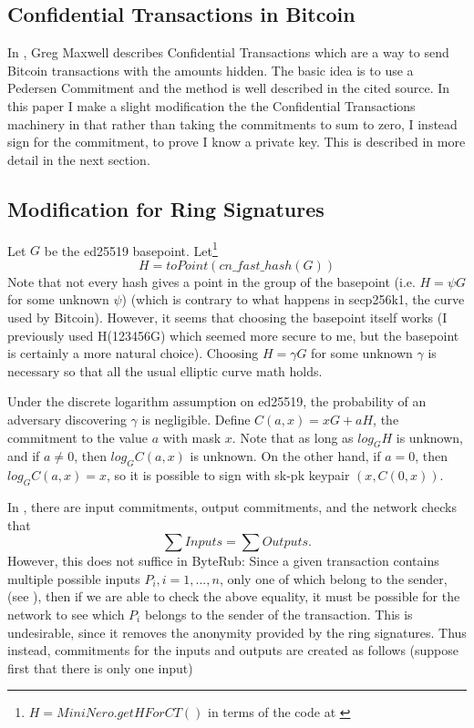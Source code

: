 \documentclass[12pt,english]{mrl}
\theoremstyle{definition}
\numberwithin{equation}{section}
\numberwithin{figure}{section}
\numberwithin{equation}{section}
\numberwithin{equation}{section}
\numberwithin{figure}{section}
\begin{document}
\subsection{Confidential Transactions in Bitcoin}

In \cite{GM}, Greg Maxwell describes Confidential Transactions which
are a way to send Bitcoin transactions with the amounts hidden. The
basic idea is to use a Pedersen Commitment and the method is well
described in the cited source. In this paper I make a slight modification
the the Confidential Transactions machinery in that rather than taking
the commitments to sum to zero, I instead sign for the commitment,
to prove I know a private key. This is described in more detail in
the next section. 


\subsection{Modification for Ring Signatures}

Let $G$ be the ed25519 basepoint. Let\footnote{$H=MiniNero.getHForCT()$ in terms of the code at \cite{Snoe}}
\[
H=toPoint\left(cn\_fast\_hash\left(G\right)\right)
\]
Note that not every hash gives a point in the group of the basepoint (i.e. $H=\psi G$ for some unknown $\psi$) (which is contrary to what happens in secp256k1, the curve used by Bitcoin). However, it seems that choosing the basepoint itself works (I previously used H(123456G) which seemed more secure to me, but the basepoint is certainly a more natural choice). 
Choosing $H = \gamma G$ for some unknown $\gamma$ is necessary so that all the usual elliptic curve math holds.

Under the discrete
logarithm assumption on ed25519, the probability of an adversary discovering $\gamma$
is negligible.  
Define $C\left(a,x\right)=xG+aH$, the commitment to the value $a$
with mask $x$. Note that as long as $log_{G}H$ is unknown, and if
$a\neq0$, then $log_{G}C\left(a,x\right)$ is unknown. On the other
hand, if $a=0$, then $log_{G}C\left(a,x\right)=x$, so it is possible
to sign with sk-pk keypair $\left(x,C\left(0,x\right)\right).$ 

In \cite{GM}, there are input commitments, output commitments, and
the network checks that 
\[
\sum Inputs=\sum Outputs.
\]
 However, this does not suffice in ByteRub: Since a given transaction
contains multiple possible inputs $P_{i},i=1,...,n$, only one of
which belong to the sender, (see \cite[4.4]{CN}), then if we are
able to check the above equality, it must be possible for the network
to see which $P_{i}$ belongs to the sender of the transaction. This
is undesirable, since it removes the anonymity provided by the ring
signatures. Thus instead, commitments for the inputs and outputs are
created as follows (suppose first that there is only one input)
\end{document}
